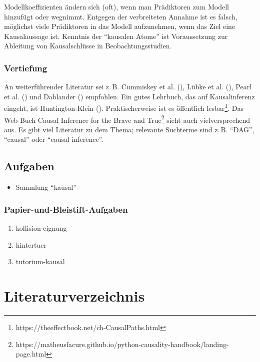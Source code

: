 \documentclass[
  ngerman,
  letterpaper,
  twoside,
  open=any]{scrbook}
\providecommand{\tightlist}{%
  \setlength{\itemsep}{0pt}\setlength{\parskip}{0pt}}\usepackage{longtable,booktabs,array}
\theoremstyle{definition}
\theoremstyle{plain}
\theoremstyle{definition}
\theoremstyle{definition}
\theoremstyle{definition}
\theoremstyle{definition}
\theoremstyle{remark}
\begin{document}
Modellkoeffizienten ändern sich (oft), wenn man Prädiktoren zum Modell
hinzufügt oder wegnimmt. Entgegen der verbreiteten Annahme ist es
falsch, möglichst viele Prädiktoren in das Modell aufzunehmen, wenn das
Ziel eine Kausalaussage ist. Kenntnis der \enquote{kausalen Atome} ist
Voraussetzung zur Ableitung von Kausalschlüsse in Beobachtungsstudien.

\subsection{Vertiefung}\label{vertiefung-7}

An weiterführender Literatur sei z.\,B. Cummiskey et al.
(), Lübke et al.
(), Pearl et al.
() und Dablander
() empfohlen. Ein gutes Lehrbuch, das
auf Kausalinferenz eingeht, ist Huntington-Klein
(). Praktischerweise ist es
öffentlich lesbar\footnote{https://theeffectbook.net/ch-CausalPaths.html}.
Das Web-Buch Causal Inference for the Brave and True\footnote{https://matheusfacure.github.io/python-causality-handbook/landing-page.html}
sieht auch vielversprechend aus. Es gibt viel Literatur zu dem Thema;
relevante Suchterme sind z.\,B. \enquote{DAG}, \enquote{causal} oder
\enquote{causal inference}.

\section{Aufgaben}\label{aufgaben-12}

\begin{itemize}
\tightlist
\item
  Sammlung \enquote{kausal}
\end{itemize}

\subsection{Papier-und-Bleistift-Aufgaben}\label{papier-und-bleistift-aufgaben-6}

\begin{enumerate}
\def\labelenumi{\arabic{enumi}.}
\tightlist
\item
  kollision-eignung
\item
  hintertuer
\item
  tutorium-kausal
\end{enumerate}

\chapter*{Literaturverzeichnis}\label{literaturverzeichnis}
\end{document}
